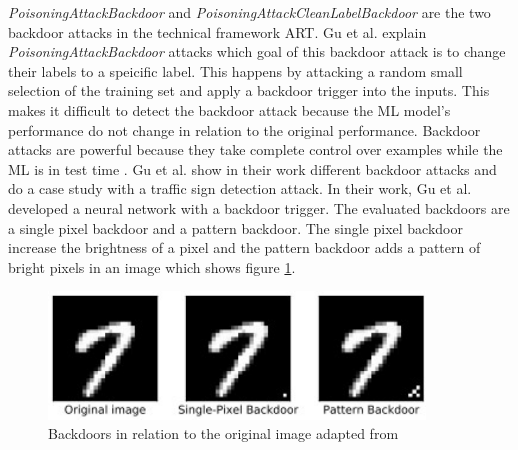 \textit{PoisoningAttackBackdoor} and \textit{PoisoningAttackCleanLabelBackdoor} are the two backdoor attacks in the technical framework ART. Gu et al. \cite{DBLP:journals/corr/abs-1708-06733} explain \textit{PoisoningAttackBackdoor} attacks which goal of this backdoor attack is to change their labels to a speicific label. This happens by attacking a random small selection of the training set and apply a backdoor trigger into the inputs. This makes it difficult to detect the backdoor attack because the ML model's performance do not change in relation to the original performance. Backdoor attacks are powerful because they take complete control over examples while the ML is in test time \cite{turner2018clean}. Gu et al. show in their work different backdoor attacks and do a case study with a traffic sign detection attack. In their work, Gu et al. developed a neural network with a backdoor trigger. The evaluated backdoors are a single pixel backdoor and a pattern backdoor. The single pixel backdoor increase the brightness of a pixel and the pattern backdoor adds a pattern of bright pixels in an image which shows figure \ref{fig:backdoor_pattern}.

\begin{figure}[ht!]
  \centering
  \includegraphics[width=10cm]{pictures/backdoor_pattern_bad_net.jpg}
  \caption{Backdoors in relation to the original image adapted from \cite{DBLP:journals/corr/abs-1708-06733}}
  \label{fig:backdoor_pattern}
\end{figure}

